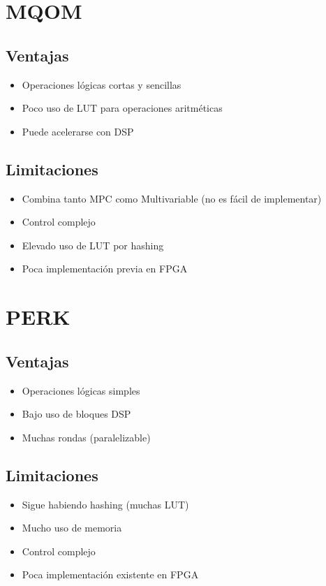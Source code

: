 \section{MQOM}

\subsection*{Ventajas}
\begin{itemize}
\item Operaciones lógicas cortas y sencillas
\item Poco uso de LUT para operaciones aritméticas
\item Puede acelerarse con DSP
\end{itemize}

\subsection*{Limitaciones}
\begin{itemize}
\item Combina tanto MPC como Multivariable (no es fácil de implementar)
\item Control complejo
\item Elevado uso de LUT por hashing
\item Poca implementación previa en FPGA
\end{itemize}

\section{PERK}

\subsection*{Ventajas}
\begin{itemize}
\item Operaciones lógicas simples
\item Bajo uso de bloques DSP
\item Muchas rondas (paralelizable)
\end{itemize}

\subsection*{Limitaciones}
\begin{itemize}
\item Sigue habiendo hashing (muchas LUT)
\item Mucho uso de memoria
\item Control complejo
\item Poca implementación existente en FPGA
\end{itemize}

